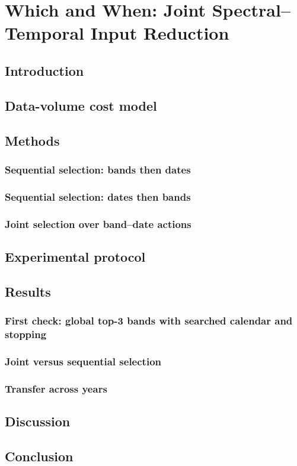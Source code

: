\chapter{Which and When: Joint Spectral--Temporal Input Reduction}
\label{ch:joint}

\section{Introduction}

\section{Data-volume cost model}

\section{Methods}
\subsection{Sequential selection: bands then dates}
\subsection{Sequential selection: dates then bands}
\subsection{Joint selection over band--date actions}

\section{Experimental protocol}

\section{Results}
\subsection{First check: global top-3 bands with searched calendar and stopping}
\subsection{Joint versus sequential selection}
\subsection{Transfer across years}

\section{Discussion}

\section{Conclusion}
